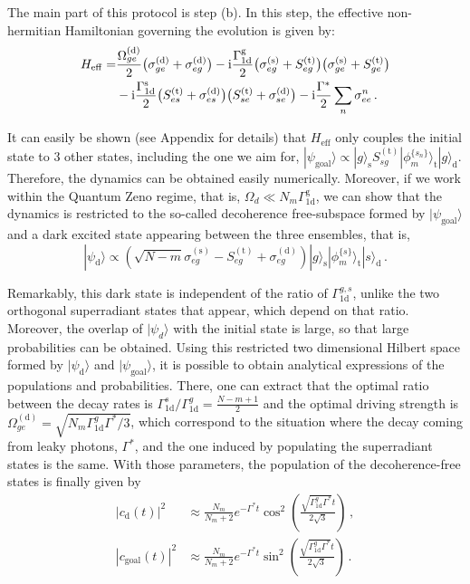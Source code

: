 \documentclass[twocolumn,pra,aps,superscriptaddress,showpacs]{revtex4-1}
\newcommand{\ket}[1]{|#1\rangle}
\def\oned{\mathrm{1d}}
\newcommand{\src}{\mathrm{(s)}}
\newcommand{\trg}{\mathrm{(t)}}
\newcommand{\dtc}{\mathrm{(d)}}
\def\ii{\mathord{\rm i}}
\newcommand{\rs}{\mathrm{s}}
\newcommand{\rd}{\mathrm{d}}
\newcommand{\rg}{\mathrm{g}}
\newcommand{\rt}{\mathrm{t}}
\begin{document}
The main part of this protocol is step (b). In this step, the effective non-hermitian Hamiltonian governing the evolution is given by:
%
%
\begin{align} \label{eq:3Ham}
H_{\mathrm{eff}} 
	=& \frac{\Omega_{ge}^\dtc}{2}\big(\sigma_{ge}^\dtc+\sigma_{eg}^\dtc \big)
		-\ii \frac{\Gamma_{\oned}^\rg}{2}\big(\sigma_{eg}^\src+S_{eg}^\trg \big)\big(\sigma_{ge}^\src+S_{ge}^\trg \big)\nonumber \\
	& -\ii \frac{\Gamma_{\oned}^\rs}{2}\big(S_{es}^\trg + \sigma_{es}^\dtc \big)\big(S_{se}^\trg + \sigma_{se}^\dtc \big)
		-\ii \frac{\Gamma^*}{2}\sum_{n}\sigma^{n}_{ee}\,.
\end{align}

It can easily be shown (see Appendix for details) that $H_\mathrm{eff}$ only couples the initial state to 3 other states, including the one we aim for, $\ket{\psi_{\mathrm{goal}}} \propto \ket{g}_\rs S_{sg}^\trg \ket{\phi_m^{ \{ s_n \}}}_\rt \ket{g}_\rd$. Therefore, the dynamics can be obtained easily numerically. Moreover, if we work within the Quantum Zeno regime, that is,  $\Omega_d\ll N_m\Gamma_\oned^\rg$, we can show that the dynamics is restricted to the so-called decoherence free-subspace formed by $\ket{\psi_{\mathrm{goal}}}$ and a dark excited state appearing between the three ensembles, that is,
\begin{equation}
\ket{\psi_\rd} 
	\propto \left( \sqrt{N-m} \sigma_{eg}^\src - S_{eg}^\trg + \sigma_{eg}^\dtc \right) 
		\ket{g}_\rs \ket{\phi_m^{ \{ s \}}}_\rt \ket{s}_\rd\,.
\end{equation}

Remarkably, this dark state is independent of the ratio of $\Gamma_\oned^{g,s}$, unlike the two orthogonal superradiant states that appear, which depend on that ratio. Moreover, the overlap of $\ket{\psi_d}$ with the initial state is large, so that large probabilities can be obtained. Using this restricted two dimensional Hilbert space formed by $\ket{\psi_\rd}$ and $\ket{\psi_{\mathrm{goal}}}$, it is possible to obtain analytical expressions of the populations and probabilities. There, one can extract that the optimal ratio between the decay rates is $\Gamma_{\oned}^s / \Gamma_{\oned}^g = \frac{N-m+1}{2}$ and the optimal driving strength is $\Omega_{ge}^\dtc = \sqrt{N_m\Gamma_\oned^g \Gamma^*/3}$, which correspond to the situation where the decay coming from leaky photons, $\Gamma^*$, and the one induced by populating the superradiant states is the same. With those parameters, the population of the decoherence-free states is finally given by
%
\begin{subequations}\label{eq:3pop}
\begin{align}
|c_\rd(t)|^2 
&\approx \frac{N_m}{N_m+2} e^{-\Gamma^*t} \cos^2(\frac{\sqrt{\Gamma_\oned^g \Gamma^*}t}{2\sqrt{3}})\,, \\
|c_\mathrm{goal}(t)|^2
&\approx \frac{N_m}{N_m+2} e^{-\Gamma^*t} \sin^2(\frac{\sqrt{\Gamma_\oned^g \Gamma^*}t}{2\sqrt{3}})\,.
\end{align}
\end{subequations}
\end{document}
